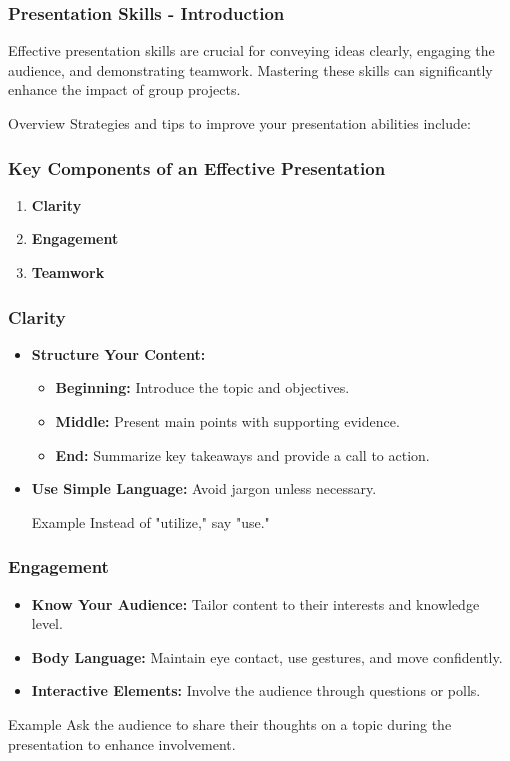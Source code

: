 \documentclass[aspectratio=169]{beamer}
\begin{document}
\begin{frame}[fragile]
    \frametitle{Presentation Skills - Introduction}
    Effective presentation skills are crucial for conveying ideas clearly, engaging the audience, and demonstrating teamwork. 
    Mastering these skills can significantly enhance the impact of group projects.
    \begin{block}{Overview}
        Strategies and tips to improve your presentation abilities include:
    \end{block}
\end{frame}

\begin{frame}[fragile]
    \frametitle{Key Components of an Effective Presentation}
    \begin{enumerate}
        \item \textbf{Clarity}
        \item \textbf{Engagement}
        \item \textbf{Teamwork}
    \end{enumerate}
\end{frame}

\begin{frame}[fragile]
    \frametitle{Clarity}
    \begin{itemize}
        \item \textbf{Structure Your Content:} 
        \begin{itemize}
            \item \textbf{Beginning:} Introduce the topic and objectives.
            \item \textbf{Middle:} Present main points with supporting evidence.
            \item \textbf{End:} Summarize key takeaways and provide a call to action.
        \end{itemize}
        \item \textbf{Use Simple Language:} Avoid jargon unless necessary.
        \begin{block}{Example}
            Instead of "utilize," say "use."
        \end{block}
    \end{itemize}
\end{frame}

\begin{frame}[fragile]
    \frametitle{Engagement}
    \begin{itemize}
        \item \textbf{Know Your Audience:} Tailor content to their interests and knowledge level.
        \item \textbf{Body Language:} Maintain eye contact, use gestures, and move confidently.
        \item \textbf{Interactive Elements:} Involve the audience through questions or polls.
    \end{itemize}
    \begin{block}{Example}
        Ask the audience to share their thoughts on a topic during the presentation to enhance involvement.
    \end{block}
\end{frame}
\end{document}
